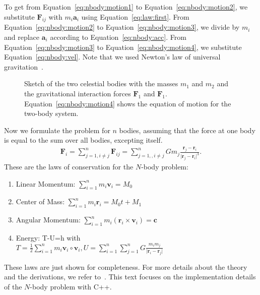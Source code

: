 To get from Equation~\eqref{eq:nbody:motion1} to Equation~\eqref{eq:nbody:motion2}, we substitute $\mathbf{F}_{ij}$ with $m_i \mathbf{a}_i$ using Equation~\ref{eq:law:first}.  From Equation~\eqref{eq:nbody:motion2} to Equation~\eqref{eq:nbody:motion3}, we divide by $m_i$ and replace $\mathbf{a}_i$ according to Equation~\ref{eq:nbody:acc}. From Equation~\eqref{eq:nbody:motion3} to Equation~\eqref{eq:nbody:motion4}, we substitute Equation~\ref{eq:nbody:vel}. Note that we used Newton's law of universal gravitation~\cite{newton1833philosophiae}.\\


\begin{figure}[tb]
\centering
{}
\caption{Sketch of the two celestial bodies with the masses $m_1$ and $m_2$ and the gravitational interaction forces $\mathbf{F}_1$ and $\mathbf{F}_1$. Equation~\ref{eq:nbody:motion4} shows the equation of motion for the two-body system.   }
\label{fig:nbody:motion}
\end{figure}

Now we formulate the problem for $n$ bodies, assuming that the force at one body is equal to the sum over all bodies, excepting itself.
\begin{align}
\mathbf{F}_i = \sum\limits_{j=1,i\neq j}^n \mathbf{F}_{ij} = \sum\limits_{j=1,,i\neq j}^n G  m_j \frac{\mathbf{r}_j - \mathbf{r}_i}{\vert \mathbf{r}_j - \mathbf{r}_i\vert^3} \text{.} \label{eq:nbody:motion}
\end{align}
These are the laws of conservation for the $N$-body problem:
\begin{enumerate}
\item Linear Momentum: $\sum\limits_{i=1}^n m_i \mathbf{v}_i = M_0$
\item Center of Mass: $\sum\limits_{i=1}^n m_i \mathbf{r}_i = M_0 t + M_1$
\item Angular Momentum: $\sum\limits_{i=1}^n m_i (\mathbf{r}_i \times \mathbf{v}_i) = \mathbf{c}$
\item Energy: T-U=h with \\
$ T = \frac{1}{2} \sum\limits_{i=1}^n m_i \mathbf{v}_i \circ \mathbf{v}_i  , U= \sum\limits_{i=1}^n \sum\limits_{j=1}^n G \frac{m_i m_j}{\vert\mathbf{r}_i - \mathbf{r}_j\vert} $
\end{enumerate}
These laws are just shown for completeness. For more details about the theory and the derivations, we refer to~\cite{aarseth2008cambridge,aarseth2003gravitational}. This text focuses on the implementation details of the $N$-body problem with C++.


